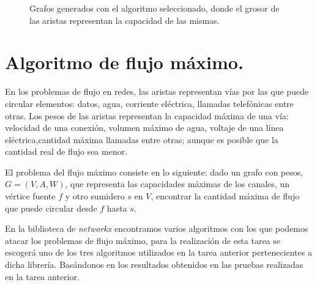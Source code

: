\documentclass{article}
\begin{document}
\begin{figure}[htbp]
\caption{Grafos generados con el algoritmo seleccionado, donde el grosor de las aristas representan la capacidad de las mismas.}
\label{fig1} 
\end{figure}


\newpage
\section{Algoritmo de flujo máximo.}
En los problemas de flujo en redes, las aristas representan vías por las que puede circular elementos: datos, agua, corriente eléctrica, llamadas telefónicas entre otras. Los pesos de las aristas representan la capacidad máxima de una vía: velocidad de una conexión, volumen máximo de agua, voltaje de una línea eléctrica,cantidad máxima llamadas entre otras; aunque es posible que la cantidad real de flujo sea menor.

El problema del flujo máximo consiste en lo siguiente: dado un grafo con pesos, $G = (V, A, W)$, que representa las capacidades máximas de los canales, un vértice fuente $f$ y otro sumidero $s$ en $ V $, encontrar la cantidad máxima de flujo que puede circular desde $f$ hasta $s$.

En la biblioteca de \textit{networkx} encontramos varios algoritmos con los que podemos atacar los problemas de flujo máximo, para la realización de esta tarea se escogerá uno de los tres algoritmos utilizados en la tarea anterior pertenecientes a dicha librería. Basándonos en los resultados obtenidos en las pruebas realizadas en la tarea anterior.
\end{document}
